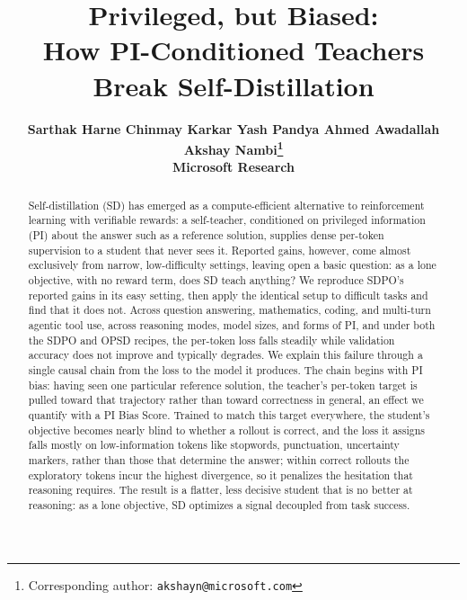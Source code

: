 \documentclass{article}
\title{Privileged, but Biased: \\ How PI-Conditioned Teachers Break Self-Distillation}
\author{%
  \bfseries
  Sarthak Harne\hspace{0.8em}
  Chinmay Karkar\hspace{0.8em}
  Yash Pandya\hspace{0.8em}
  Ahmed Awadallah\hspace{0.8em}
  Akshay Nambi\thanks{Corresponding author: \texttt{akshayn@microsoft.com}} \\[2pt]
  Microsoft Research \\
}
\begin{document}
\maketitle
\vspace{-5pt}
\begin{abstract}
Self-distillation (SD) has emerged as a compute-efficient alternative to reinforcement learning with verifiable rewards: a self-teacher, conditioned on privileged information (PI) about the answer such as a reference solution, supplies dense per-token supervision to a student that never sees it. Reported gains, however, come almost exclusively from narrow, low-difficulty settings, leaving open a basic question: as a lone objective, with no reward term, does SD teach anything? We reproduce SDPO's reported gains in its easy setting, then apply the identical setup to difficult tasks and find that it does not. Across question answering, mathematics, coding, and multi-turn agentic tool use, across reasoning modes, model sizes, and forms of PI, and under both the SDPO and OPSD recipes, the per-token loss falls steadily while validation accuracy does not improve and typically degrades. We explain this failure through a single causal chain from the loss to the model it produces. The chain begins with PI bias: having seen one particular reference solution, the teacher's per-token target is pulled toward that trajectory rather than toward correctness in general, an effect we quantify with a PI Bias Score. Trained to match this target everywhere, the student's objective becomes nearly blind to whether a rollout is correct, and the loss it assigns falls mostly on low-information tokens like stopwords, punctuation, uncertainty markers, rather than those that determine the answer; within correct rollouts the exploratory tokens incur the highest divergence, so it penalizes the hesitation that reasoning requires. The result is a flatter, less decisive student that is no better at reasoning: as a lone objective, SD optimizes a signal decoupled from task success.
\end{abstract}
\vspace{-10pt}
\end{document}
